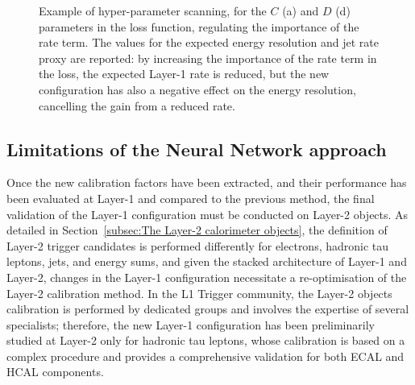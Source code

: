 \begin{figure}
    \centering
    \hspace{1cm}
    \caption{Example of hyper-parameter scanning, for the $C$ (a) and $D$ (d) parameters in the loss function, regulating the importance of the rate term. The values for the expected energy resolution and jet rate proxy are reported: by increasing the importance of the rate term in the loss, the expected Layer-1 rate is reduced, but the new configuration has also a negative effect on the energy resolution, cancelling the gain from a reduced rate.}
    \label{fig:NN_HyperParameters}
\end{figure}

\subsection{Limitations of the Neural Network approach}

Once the new calibration factors have been extracted, and their performance has been evaluated at Layer-1 and compared to the previous method, the final validation of the Layer-1 configuration must be conducted on Layer-2 objects. 
As detailed in Section~\ref{subsec:The Layer-2 calorimeter objects}, the definition of Layer-2 trigger candidates is performed differently for electrons, hadronic tau leptons, jets, and energy sums, and given the stacked architecture of Layer-1 and Layer-2, changes in the Layer-1 configuration necessitate a re-optimisation of the Layer-2 calibration method. 
In the L1 Trigger community, the Layer-2 objects calibration is performed by dedicated groups and involves the expertise of several specialists; therefore, the new Layer-1 configuration has been preliminarily studied at Layer-2 only for hadronic tau leptons, whose calibration is based on a complex procedure and provides a comprehensive validation for both ECAL and HCAL components.

